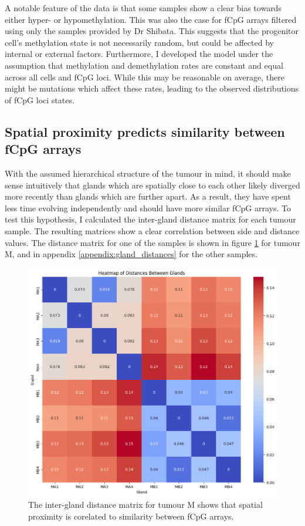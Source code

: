 A notable feature of the data is that some samples show a clear bias towards
either hyper- or hypomethylation. This was also the case for fCpG arrays
filtered using only the samples provided by Dr Shibata. This suggests that the
progenitor cell's methylation state is not necessarily random, but could be
affected by internal or external factors. Furthermore, I developed the model
under the assumption that methylation and demethylation rates are constant and
equal across all cells and fCpG loci. While this may be reasonable on average,
there might be mutations which affect these rates, leading to the observed
distributions of fCpG loci states.

\subsection{Spatial proximity predicts similarity between fCpG arrays}
With the assumed hierarchical structure of the tumour in mind, it should make
sense intuitively that glands which are spatially close to each other likely
diverged more recently than glands which are further apart. As a result, they
have spent less time evolving independently and should have more similar fCpG
arrays. To test this hypothesis, I calculated the inter-gland distance matrix
for each tumour sample. The resulting matrices show a clear correlation between
side and distance values. The distance matrix for one of the samples is shown
in figure \ref{fig:gland_dist_M} for tumour M, and in appendix
\ref{appendix:gland_distances} for the other samples.

\begin{figure}[h]
    \centering
    \includegraphics[width=\textwidth]{Chapter_5/figures/gland_dist_M.png}
    \caption{The inter-gland distance matrix for tumour M shows that spatial
    proximity is corelated to similarity between fCpG arrays.}
    \label{fig:gland_dist_M}
\end{figure}

